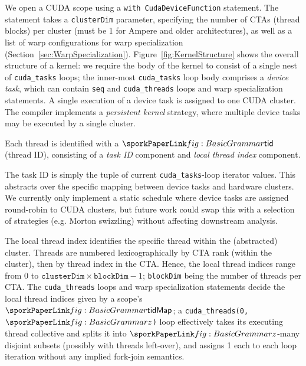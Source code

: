 
We open a CUDA scope using a \texttt{with CudaDeviceFunction} statement.
The statement takes a \texttt{clusterDim} parameter,
specifying the number of CTAs (thread blocks) per cluster (must be 1 for Ampere and older architectures),
as well as a list of warp configurations for warp specialization (Section~\ref{sec:WarpSpecialization}).
Figure~\ref{fig:KernelStructure} shows the overall structure of a kernel:
we require the body of the kernel to consist of a single nest of \texttt{cuda\_tasks} loops;
the inner-most \texttt{cuda\_tasks} loop body comprises a \emph{device task},
which can contain \texttt{seq} and \texttt{cuda\_threads} loops and warp specialization statements.
A single execution of a device task is assigned to one CUDA cluster.
The compiler implements a \emph{persistent kernel} strategy, where multiple device tasks may be executed by a single cluster.



Each thread is identified with a $\sporktid$ (thread ID), consisting of a \emph{task ID} component and \emph{local thread index} component.


The task ID is simply the tuple of current \texttt{cuda\_tasks}-loop iterator values.
This abstracts over the specific mapping between device tasks and hardware clusters.
We currently only implement a static schedule where device tasks are assigned round-robin to CUDA clusters,
but future work could swap this with a selection of strategies (e.g. Morton swizzling)
without affecting downstream analysis.

The local thread index identifies the specific thread within the (abstracted) cluster.
Threads are numbered lexicographically by CTA rank (within the cluster), then by thread index in the CTA.
Hence, the local thread indices range from 0 to $\texttt{clusterDim}\times\texttt{blockDim}-1$;
\texttt{blockDim} being the number of threads per CTA.
The \texttt{cuda\_threads} loops and warp specialization statements decide the local thread indices given by a scope's $\sporktidMap$;
a \texttt{cuda\_threads(0, $\sporkz$)} loop effectively takes its executing thread collective and splits it into $\sporkz$-many disjoint subsets
(possibly with threads left-over),
and assigns 1 each to each loop iteration without any implied fork-join semantics.
